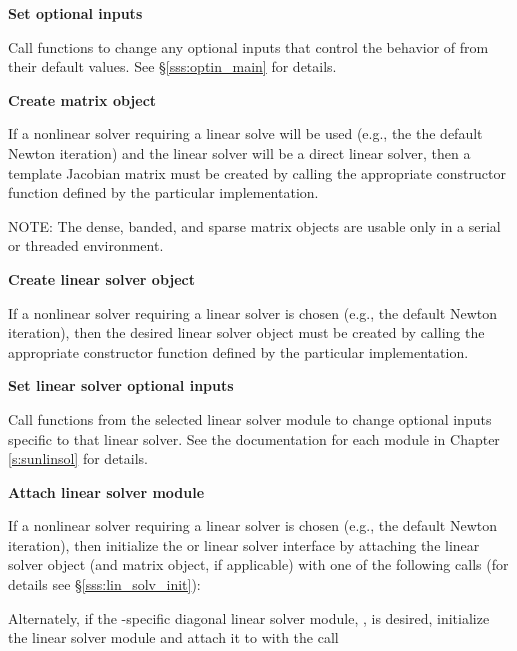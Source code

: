 \begin{Steps}
\item
  {\bf Set optional inputs}

  Call  functions to change any
  optional inputs that control the behavior of {\cvode} from their default values.
  See \S\ref{sss:optin_main} for details.

\item\label{i:matrix}
  {\bf Create matrix object}

  If a nonlinear solver requiring a linear solve will be used (e.g., the
  the default Newton iteration) and the linear solver will be a direct linear
  solver, then a template Jacobian matrix must be created by calling the
  appropriate constructor function defined by the particular {\sunmatrix}
  implementation.

  NOTE: The dense, banded, and sparse matrix objects are usable only in a
  serial or threaded environment.

\item\label{i:lin_solver}
  {\bf Create linear solver object}

  If a nonlinear solver requiring a linear solver is chosen (e.g., the default
  Newton iteration), then the desired linear solver object must be created by
  calling the appropriate constructor function defined by the particular
  {\sunlinsol} implementation.

\item
  {\bf Set linear solver optional inputs}

  Call  functions from the selected linear solver module to
  change optional inputs specific to that linear solver.
  See the documentation for each {\sunlinsol} module in Chapter
  {\ref{s:sunlinsol}} for details.

\item\label{i:lin_solver_interface}
  {\bf Attach linear solver module}

  If a nonlinear solver requiring a linear solver is chosen (e.g., the default
  Newton iteration), then initialize the {\cvdls} or {\cvspils} linear solver
  interface by attaching the linear solver object (and matrix object, if
  applicable) with one of the following calls (for details see
  \S\ref{sss:lin_solv_init}):



  Alternately, if the {\cvode}-specific diagonal linear solver module,
  {\cvdiag}, is desired, initialize the linear solver module and
  attach it to {\cvode} with the call


\end{Steps}
